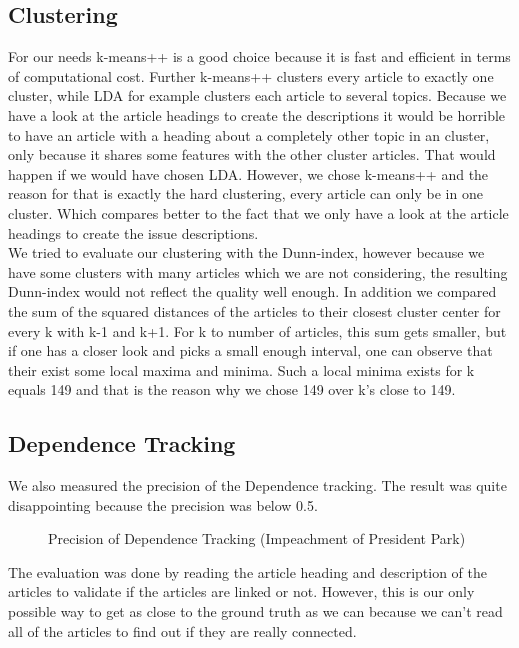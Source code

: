 \subsection{Clustering}
For our needs k-means++ is a good choice because it is fast and efficient in terms of computational cost. Further k-means++ clusters every article to exactly one cluster, while LDA for example clusters each article to several topics. Because we have a look at the article headings to create the descriptions it would be horrible to have an article with a heading about a completely other topic in an cluster, only because it shares some features with the other cluster articles. That would happen if we would have chosen LDA. However, we chose k-means++ and the reason for that is exactly the hard clustering, every article can only be in one cluster. Which compares better to the fact that we only have a look at the article headings to create the issue descriptions.\\
We tried to evaluate our clustering with the Dunn-index, however because we have some clusters with many articles which we are not considering, the resulting Dunn-index would not reflect the quality well enough. In addition we compared the sum of the squared distances of the articles to their closest cluster center for every k with k-1 and k+1. For k to number of articles, this sum gets smaller, but if one has a closer look and picks a small enough interval, one can observe that their exist some local maxima and minima. Such a local minima exists for k equals 149 and that is the reason why we chose 149 over k's close to 149.

\subsection{Dependence Tracking}
We also measured the precision of the Dependence tracking. The result was quite disappointing because the precision was below 0.5.

\begin{figure}[h]
\caption{Precision of Dependence Tracking (Impeachment of President Park)}
\end{figure}
The evaluation was done by reading the article heading and description of the articles to validate if the articles are linked or not. However, this is our only possible way to get as close to the ground truth as we can because we can't read all of the articles to find out if they are really connected.